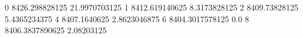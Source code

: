 0 8426.298828125 21.9970703125
1 8412.619140625 8.3173828125
2 8409.73828125 5.4365234375
4 8407.1640625 2.8623046875
6 8404.3017578125 0.0
8 8406.3837890625 2.08203125
